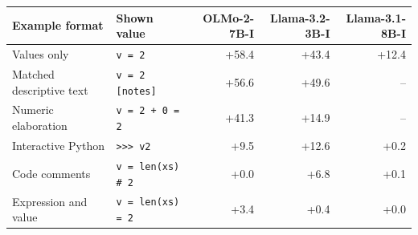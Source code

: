 \begin{tabular}{@{}llrrr@{}}
\toprule
Example format & Shown value & OLMo-2-7B-I & Llama-3.2-3B-I & Llama-3.1-8B-I \\
\midrule
Values only & \texttt{v = 2} & +58.4 & +43.4 & +12.4 \\
Matched descriptive text & \texttt{v = 2 [notes]} & +56.6 & +49.6 & -- \\
Numeric elaboration & \texttt{v = 2 + 0 = 2} & +41.3 & +14.9 & -- \\
Interactive Python & \texttt{>>> v}\quad\texttt{2} & +9.5 & +12.6 & +0.2 \\
Code comments & \texttt{v = len(xs) \# 2} & +0.0 & +6.8 & +0.1 \\
Expression and value & \texttt{v = len(xs) = 2} & +3.4 & +0.4 & +0.0 \\
\bottomrule
\end{tabular}
